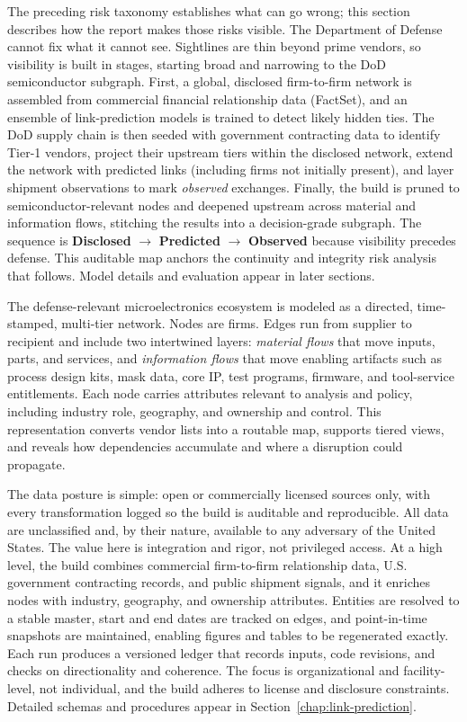 The preceding risk taxonomy establishes what can go wrong; this section describes how the report makes those risks visible. The Department of Defense cannot fix what it cannot see. Sightlines are thin beyond prime vendors, so visibility is built in stages, starting broad and narrowing to the DoD semiconductor subgraph. First, a global, disclosed firm-to-firm network is assembled from commercial financial relationship data (FactSet), and an ensemble of link-prediction models is trained to detect likely hidden ties. The DoD supply chain is then seeded with government contracting data to identify Tier-1 vendors, project their upstream tiers within the disclosed network, extend the network with predicted links (including firms not initially present), and layer shipment observations to mark \emph{observed} exchanges. Finally, the build is pruned to semiconductor-relevant nodes and deepened upstream across material and information flows, stitching the results into a decision-grade subgraph. The sequence is \textbf{Disclosed} $\rightarrow$ \textbf{Predicted} $\rightarrow$ \textbf{Observed} because visibility precedes defense. This auditable map anchors the continuity and integrity risk analysis that follows. Model details and evaluation appear in later sections.

The defense-relevant microelectronics ecosystem is modeled as a directed, time-stamped, multi-tier network. Nodes are firms. Edges run from supplier to recipient and include two intertwined layers: \emph{material flows} that move inputs, parts, and services, and \emph{information flows} that move enabling artifacts such as process design kits, mask data, core IP, test programs, firmware, and tool-service entitlements. Each node carries attributes relevant to analysis and policy, including industry role, geography, and ownership and control. This representation converts vendor lists into a routable map, supports tiered views, and reveals how dependencies accumulate and where a disruption could propagate.

The data posture is simple: open or commercially licensed sources only, with every transformation logged so the build is auditable and reproducible. All data are unclassified and, by their nature, available to any adversary of the United States. The value here is integration and rigor, not privileged access. At a high level, the build combines commercial firm-to-firm relationship data, U.S. government contracting records, and public shipment signals, and it enriches nodes with industry, geography, and ownership attributes. Entities are resolved to a stable master, start and end dates are tracked on edges, and point-in-time snapshots are maintained, enabling figures and tables to be regenerated exactly. Each run produces a versioned ledger that records inputs, code revisions, and checks on directionality and coherence. The focus is organizational and facility-level, not individual, and the build adheres to license and disclosure constraints. Detailed schemas and procedures appear in Section~\ref{chap:link-prediction}.

